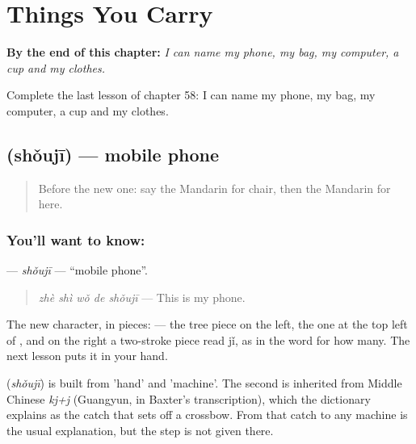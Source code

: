 
\chapter{Things You Carry}
\label{ch:zh-things-you-carry}

\begin{chapteropening}
\textbf{By the end of this chapter:} \emph{I can name my phone, my bag, my computer, a cup and my clothes.}

Complete the last lesson of chapter 58: I can name my phone, my bag, my computer, a cup and my clothes.
\end{chapteropening}

\section[\texorpdfstring{\zh{手机} (shǒujī)}{手机 (shǒujī)}]{ (shǒujī) — mobile phone}

\label{lesson:ZH-C58-shouji}



\begin{quote}
Before the new one: say the Mandarin for chair, then the Mandarin for here.
\end{quote}

\subsection*{You'll want to know: }
\textbf{} — \emph{shǒujī} — \textquotedblleft{}mobile phone\textquotedblright{}.

\begin{quote}
\textbf{} \emph{zhè shì wǒ de shǒujī} — This is my phone.
\end{quote}

The new character, in pieces:  — the tree piece on the left, the one at the top left of , and on the right a two-stroke piece read jǐ, as in the word for how many. The next lesson puts it in your hand.

\begin{cousinweb}
\textbf{} (\emph{shǒujī}) is built from  'hand' and  'machine'. The second is inherited from Middle Chinese \emph{kj+j} (Guangyun, in Baxter's transcription), which the dictionary explains as the catch that sets off a crossbow. From that catch to any machine is the usual explanation, but the step is not given there.
\end{cousinweb}

